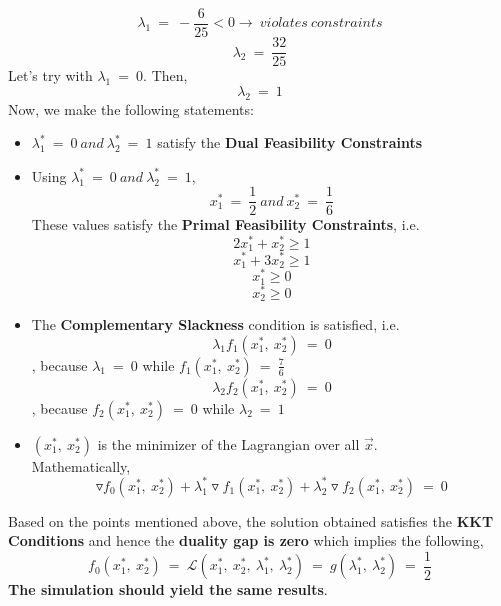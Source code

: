 \documentclass[12pt, draftcls, onecolumn]{IEEEtran}
\begin{document}
\[\lambda_1\ =\ -\frac{6}{25} < 0 \longrightarrow\ violates\ constraints\]
\[\lambda_2\ =\ \frac{32}{25}\]
Let's try with $\lambda_1\ =\ 0$. Then,
\[\lambda_2\ =\ 1\]
Now, we make the following statements:
\begin{itemize}
    \item $\lambda_1^*\ =\ 0\ and\ \lambda_2^*\ =\ 1$ satisfy the \textbf{Dual Feasibility Constraints}
    \item Using $\lambda_1^*\ =\ 0\ and\ \lambda_2^*\ =\ 1$,
    \[x_1^*\ =\ \frac{1}{2}\ and\ x_2^*\ =\ \frac{1}{6}\]
    These values satisfy the \textbf{Primal Feasibility Constraints}, i.e. 
    \[2x_1^* + x_2^* \geq 1\]
    \[x_1^* + 3x_2^* \geq 1\]
    \[x_1^* \geq 0\]
    \[x_2^* \geq 0\]
    \item The \textbf{Complementary Slackness} condition is satisfied, i.e.
    \[\lambda_1 f_1(x_1^*,\ x_2^*)\ =\ 0\], because $\lambda_1\ =\ 0$ while $f_1(x_1^*,\ x_2^*)\ =\ \frac{7}{6}$
    \[\lambda_2 f_2(x_1^*,\ x_2^*)\ =\ 0\], because $f_2(x_1^*,\ x_2^*)\ =\ 0$ while $\lambda_2\ =\ 1$
    \item $(x_1^*,\ x_2^*)$ is the minimizer of the Lagrangian over all $\vec{x}$.
    \\Mathematically,
    \[\triangledown f_0(x_1^*,\ x_2^*) + \lambda_1^* \triangledown f_1(x_1^*,\ x_2^*) + \lambda_2^* \triangledown f_2(x_1^*,\ x_2^*)\ =\ 0\]
\end{itemize}
Based on the points mentioned above, the solution obtained satisfies the \textbf{KKT Conditions} and hence the \textbf{duality gap is zero} which implies the following,
\[f_0(x_1^*,\ x_2^*)\ =\ \mathcal{L}(x_1^*,\ x_2^*,\ \lambda_1^*,\ \lambda_2^*)\ =\ g(\lambda_1^*,\ \lambda_2^*)\ =\ \frac{1}{2}\]
\textbf{The simulation should yield the same results}.
\end{document}
